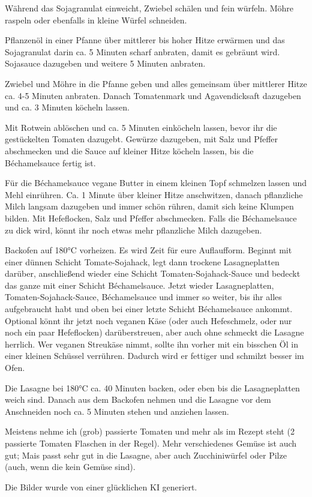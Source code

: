 \begin{recipe}
{    Während das Sojagranulat einweicht, Zwiebel schälen und fein würfeln. Möhre raspeln oder ebenfalls in kleine Würfel schneiden.

    Pflanzenöl in einer Pfanne über mittlerer bis hoher Hitze erwärmen und das Sojagranulat darin ca. 5 Minuten scharf anbraten, damit es gebräunt wird. Sojasauce dazugeben und weitere 5 Minuten anbraten.

    Zwiebel und Möhre in die Pfanne geben und alles gemeinsam über mittlerer Hitze ca. 4-5 Minuten anbraten. Danach Tomatenmark und Agavendicksaft dazugeben und ca. 3 Minuten köcheln lassen.

    Mit Rotwein ablöschen und ca. 5 Minuten einköcheln lassen, bevor ihr die gestückelten Tomaten dazugebt. Gewürze dazugeben, mit Salz und Pfeffer abschmecken und die Sauce auf kleiner Hitze köcheln lassen, bis die Béchamelsauce fertig ist.

    Für die Béchamelsauce vegane Butter in einem kleinen Topf schmelzen lassen und Mehl einrühren. Ca. 1 Minute über kleiner Hitze anschwitzen, danach pflanzliche Milch langsam dazugeben und immer schön rühren, damit sich keine Klumpen bilden. Mit Hefeflocken, Salz und Pfeffer abschmecken. Falls die Béchamelsauce zu dick wird, könnt ihr noch etwas mehr pflanzliche Milch dazugeben.

    Backofen auf 180°C vorheizen. Es wird Zeit für eure Auflaufform. Beginnt mit einer dünnen Schicht Tomate-Sojahack, legt dann trockene Lasagneplatten darüber, anschließend wieder eine Schicht Tomaten-Sojahack-Sauce und bedeckt das ganze mit einer Schicht Béchamelsauce. Jetzt wieder Lasagneplatten, Tomaten-Sojahack-Sauce, Béchamelsauce und immer so weiter, bis ihr alles aufgebraucht habt und oben bei einer letzte Schicht Béchamelsauce ankommt. Optional könnt ihr jetzt noch veganen Käse (oder auch Hefeschmelz, oder nur noch ein paar Hefeflocken) darüberstreuen, aber auch ohne schmeckt die Lasagne herrlich. Wer veganen Streukäse nimmt, sollte ihn vorher mit ein bisschen Öl in einer kleinen Schüssel verrühren. Dadurch wird er fettiger und schmilzt besser im Ofen.

    Die Lasagne bei 180°C ca. 40 Minuten backen, oder eben bis die Lasagneplatten weich sind. Danach aus dem Backofen nehmen und die Lasagne vor dem Anschneiden noch ca. 5 Minuten stehen und anziehen lassen.
}

\hint
    {%
    Meistens nehme ich (grob) passierte Tomaten und mehr als im Rezept steht (2 passierte Tomaten Flaschen in der Regel). Mehr verschiedenes Gemüse ist auch gut; Mais passt sehr gut in die Lasagne, aber auch Zucchiniwürfel oder Pilze (auch, wenn die kein Gemüse sind).

    Die Bilder wurde von einer glücklichen KI generiert.
    }

\end{recipe}
